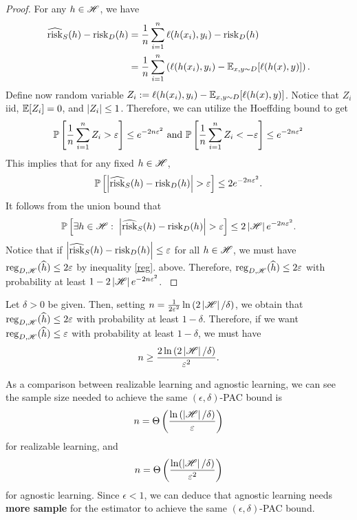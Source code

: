\documentclass[a4paper]{article}
\begin{document}
\begin{proof}
{  For any $h \in \mathscr{H}$, we have
  \[
  \begin{aligned}
    \widehat{\operatorname{risk}}_S (h) - \operatorname{risk}_D(h) 
    &= \frac{1}{n} \sum_{i=1}^n \ell(h(x_i), y_i) 
    - \operatorname{risk}_D (h) \\
    &= \frac{1}{n} \sum_{i=1}^n \left( 
      \ell(h(x_i), y_i) - \mathbb{E}_{x, y \sim D} 
      [\ell(h(x), y)]
     \right).
  \end{aligned}
  \]
  Define now random variable $Z_i := \ell(h(x_i), y_i) - 
  \mathbb{E}_{x, y \sim D} [\ell(h(x), y)]$. Notice that $Z_i$ 
  iid, $\mathbb{E}[Z_i] = 0$, and $\left\lvert Z_i\right\rvert \leq 1$. Therefore, 
  we can utilize the Hoeffding bound to get 
  \[
  \mathbb{P} \left[ \frac{1}{n} \sum_{i=1}^n Z_i > \varepsilon \right]
  \leq e^{- 2 n \varepsilon^2} \text{ and }
  \mathbb{P} \left[ \frac{1}{n} \sum_{i=1}^n Z_i < -\varepsilon \right]
  \leq e^{- 2 n \varepsilon^2}
  \]
  This implies that for any fixed $h \in \mathscr{H}$,  
  \[
  \mathbb{P} \left[ \left\lvert \widehat{\operatorname{risk}}_S(h) - \operatorname{risk}_D(h)\right\rvert > \varepsilon 
  \right] \leq 2 e^{-2 n \varepsilon^2}.
  \]
  It follows from the union bound that 
  \[
  \mathbb{P} \left[ \exists h \in \mathscr{H}: \; 
  \left\lvert \widehat{\operatorname{risk}}_S(h) - \operatorname{risk}_D(h)\right\rvert > \varepsilon \right] 
  \leq 2 \left\lvert \mathscr{H}\right\rvert e^{- 2 n \varepsilon^2}.
  \]
  Notice that if  
  $\left\lvert \widehat{\operatorname{risk}}_S (h) - \operatorname{risk}_D (h)\right\rvert \leq \varepsilon$
  for all $h \in \mathscr{H}$, we must have $\operatorname{reg}_{D, \mathscr{H}} 
  (\widehat{h}) \leq 2 \varepsilon$ by inequality \eqref{reg}.
  above. Therefore,
  $\operatorname{reg}_{D, \mathscr{H}} (\widehat{h}) \leq 2 \varepsilon$ with probability at least 
  $1 - 2 \left\lvert \mathscr{H}\right\rvert e^{- 2 n \varepsilon^2}$. 
}
\end{proof}

\begin{cor}
Let $\delta > 0$ be given. Then, 
setting 
$n = \frac{1}{2\varepsilon^2} \ln \left( 2 \left\lvert \mathscr{H}\right\rvert / 
\delta \right)$, we obtain that $\operatorname{reg}_{D, \mathscr{H}} (\widehat{h})
\leq 2\varepsilon$ with probability at least $1 - \delta$.
Therefore, if we want $\operatorname{reg}_{D, \mathscr{H}} 
(\widehat{h}) \leq \varepsilon$ with probability at least $1 - 
\delta$, we must have 
\[
  n \geq \frac{2 \ln 
  \left( 2 \left\lvert \mathscr{H}\right\rvert / \delta \right)}
  {\varepsilon^2}.
\]
\end{cor}

As a comparison between realizable learning and agnostic 
learning, we can see the sample size needed to 
achieve the same $(\epsilon, \delta)$-PAC bound is 
\[
n = \Theta \left( \frac{\ln \left( \left\lvert \mathscr{H}\right\rvert / \delta
\right)}{\varepsilon} \right)
\]
for realizable learning, and 
\[
n = \Theta \left( \frac{\ln(\left\lvert \mathscr{H}\right\rvert / \delta)}{\varepsilon^2} 
\right)
\]
for agnostic learning. Since $\epsilon < 1$, 
we can deduce that agnostic learning needs 
\textbf{more sample} for the estimator to achieve the 
same $(\epsilon, \delta)$-PAC bound.
\end{document}
